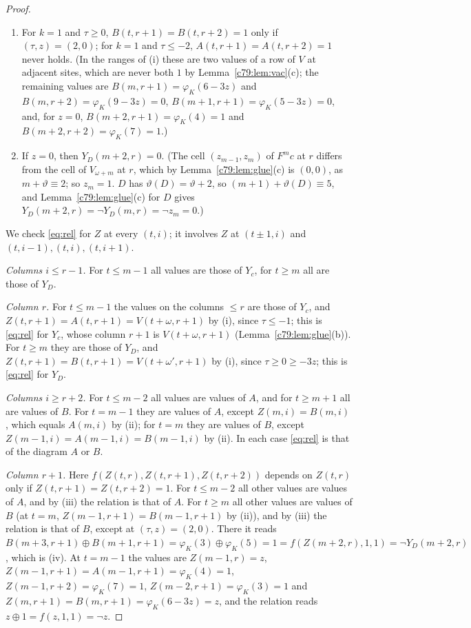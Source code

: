 \begin{proof}
\begin{enumerate}
\item[(iii)] For $k=1$ and $\tau\ge0$, $B(t,r+1)=B(t,r+2)=1$ only if $(\tau,z)=(2,0)$; for $k=1$ and $\tau\le-2$, $A(t,r+1)=A(t,r+2)=1$ never holds. (In the ranges of (i) these are two values of a row of $V$ at adjacent sites, which are never both $1$ by Lemma~\ref{c79:lem:vac}(c); the remaining values are $B(m,r+1)=\varphi_K(6-3z)$ and $B(m,r+2)=\varphi_K(9-3z)=0$, $B(m+1,r+1)=\varphi_K(5-3z)=0$, and, for $z=0$, $B(m+2,r+1)=\varphi_K(4)=1$ and $B(m+2,r+2)=\varphi_K(7)=1$.)
\item[(iv)] If $z=0$, then $Y_D(m+2,r)=0$. (The cell $(z_{m-1},z_m)$ of $F^mc$ at $r$ differs from the cell of $V_{\omega+m}$ at $r$, which by Lemma~\ref{c79:lem:glue}(c) is $(0,0)$, as $m+\vartheta\equiv2$; so $z_m=1$. $D$ has $\vartheta(D)=\vartheta+2$, so $(m+1)+\vartheta(D)\equiv5$, and Lemma~\ref{c79:lem:glue}(c) for $D$ gives $Y_D(m+2,r)=\neg Y_D(m,r)=\neg z_m=0$.)
\end{enumerate}
We check \eqref{eq:rel} for $Z$ at every $(t,i)$; it involves $Z$ at $(t\pm1,i)$ and $(t,i-1),(t,i),(t,i+1)$.

\emph{Columns $i\le r-1$.} For $t\le m-1$ all values are those of $Y_c$, for $t\ge m$ all are those of $Y_D$.

\emph{Column $r$.} For $t\le m-1$ the values on the columns $\le r$ are those of $Y_c$, and $Z(t,r+1)=A(t,r+1)=V(t+\omega,r+1)$ by (i), since $\tau\le-1$; this is \eqref{eq:rel} for $Y_c$, whose column $r+1$ is $V(t+\omega,r+1)$ (Lemma~\ref{c79:lem:glue}(b)). For $t\ge m$ they are those of $Y_D$, and $Z(t,r+1)=B(t,r+1)=V(t+\omega',r+1)$ by (i), since $\tau\ge0\ge-3z$; this is \eqref{eq:rel} for $Y_D$.

\emph{Columns $i\ge r+2$.} For $t\le m-2$ all values are values of $A$, and for $t\ge m+1$ all are values of $B$. For $t=m-1$ they are values of $A$, except $Z(m,i)=B(m,i)$, which equals $A(m,i)$ by (ii); for $t=m$ they are values of $B$, except $Z(m-1,i)=A(m-1,i)=B(m-1,i)$ by (ii). In each case \eqref{eq:rel} is that of the diagram $A$ or $B$.

\emph{Column $r+1$.} Here $f(Z(t,r),Z(t,r+1),Z(t,r+2))$ depends on $Z(t,r)$ only if $Z(t,r+1)=Z(t,r+2)=1$. For $t\le m-2$ all other values are values of $A$, and by (iii) the relation is that of $A$. For $t\ge m$ all other values are values of $B$ (at $t=m$, $Z(m-1,r+1)=B(m-1,r+1)$ by (ii)), and by (iii) the relation is that of $B$, except at $(\tau,z)=(2,0)$. There it reads $B(m+3,r+1)\oplus B(m+1,r+1)=\varphi_K(3)\oplus\varphi_K(5)=1=f(Z(m+2,r),1,1)=\neg Y_D(m+2,r)$, which is (iv). At $t=m-1$ the values are $Z(m-1,r)=z$, $Z(m-1,r+1)=A(m-1,r+1)=\varphi_K(4)=1$, $Z(m-1,r+2)=\varphi_K(7)=1$, $Z(m-2,r+1)=\varphi_K(3)=1$ and $Z(m,r+1)=B(m,r+1)=\varphi_K(6-3z)=z$, and the relation reads $z\oplus1=f(z,1,1)=\neg z$.


\end{proof}
